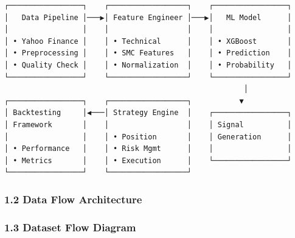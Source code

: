 \begin{verbatim}
┌─────────────────┐    ┌──────────────────┐    ┌─────────────────┐
│   Data Pipeline │───▶│ Feature Engineer │───▶│   ML Model      │
│                 │    │                  │    │                 │
│ • Yahoo Finance │    │ • Technical      │    │ • XGBoost       │
│ • Preprocessing │    │ • SMC Features   │    │ • Prediction    │
│ • Quality Check │    │ • Normalization  │    │ • Probability   │
└─────────────────┘    └──────────────────┘    └─────────────────┘
                                                       │
┌─────────────────┐    ┌──────────────────┐           ▼
│ Backtesting     │◀───│ Strategy Engine  │    ┌─────────────────┐
│ Framework       │    │                  │    │ Signal          │
│                 │    │ • Position       │    │ Generation      │
│ • Performance   │    │ • Risk Mgmt      │    │                 │
│ • Metrics       │    │ • Execution      │    └─────────────────┘
└─────────────────┘    └──────────────────┘
\end{verbatim}

\subsubsection{1.2 Data Flow Architecture}\label{data-flow-architecture}

\begin{Shaded}
\begin{Highlighting}[]
\end{Highlighting}
\end{Shaded}

\subsubsection{1.3 Dataset Flow Diagram}\label{dataset-flow-diagram}

